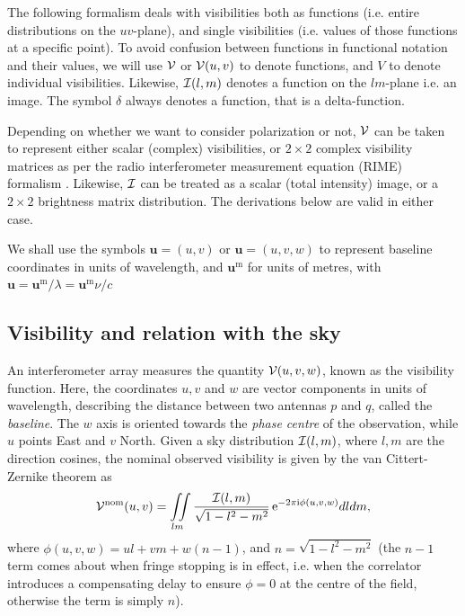 \documentclass[useAMS,usenatbib]{mn2e}
\newcommand{\ee}{\mathrm{e}}
\newcommand{\ii}{\mathrm{i}}
\begin{document}
The following formalism deals with visibilities both as functions (i.e. entire distributions on the $uv$-plane), 
and single visibilities (i.e. values of those functions at a specific point). To avoid confusion between functions in
functional notation and their values, we will use $\mathcal{V}$ or 
$\mathcal{V}(u,v)$ to denote functions, and $V$ to denote individual visibilities. Likewise, $\mathcal{I}(l,m)$ denotes a function 
on the $lm$-plane i.e. an image. The symbol $\delta$ always denotes a function, that is a delta-function.

Depending on whether we want to consider polarization or not, $\mathcal{V}$ can be taken to represent either 
scalar (complex) visibilities, or $2\times2$ complex visibility matrices  as per the radio interferometer 
measurement equation (RIME) formalism \citep{smirnov2011revisiting}. Likewise, $\mathcal{I}$ can be treated as a scalar 
(total intensity) image, or a $2\times2$ brightness matrix distribution. The derivations below 
are valid in either case.

We shall use the symbols $\mathbf{u}=(u,v)$ or $\mathbf{u}=(u,v,w)$ to represent baseline coordinates in units of wavelength, and 
$\mathbf{u}^\mathrm{m}$ for units of metres, with $\mathbf{u} = \mathbf{u}^\mathrm{m}/\lambda = \mathbf{u}^\mathrm{m}\nu/c$

\subsection{Visibility and relation with the sky}
\label{sec:visSky}
An interferometer array measures the quantity $\mathcal{V}(u,v,w)$, known as the visibility function.
Here, the coordinates $u,v$ and $w$ are vector components in units of wavelength, describing the distance between 
two antennas $p$ and $q$, called the \emph{baseline}. The $w$ axis is oriented towards the \emph{phase centre} of the observation,
while $u$ points East and $v$ North. Given a sky distribution $\mathcal{I}(l,m)$, where $l,m$ are the direction cosines,
the nominal observed visibility is given by the van 
Cittert-Zernike theorem \citep{thompson1999fundamentals} as
\begin{equation}
\VV^\mathrm{nom}(u,v) =\iint\limits_{lm} \frac{\II(l,m)}{\sqrt{1-l^2 - m^2}}\,\ee^{-2\pi\ii\phi (u,v,w)}dldm, \label{eq:visSky:nom}
\end{equation} 
where $\phi(u,v,w)=ul+vm+w(n-1)$, and $n=\sqrt{1-l^2 - m^2}$ (the $n-1$ term comes about when fringe 
stopping is in effect, i.e. when 
the correlator introduces a compensating delay to ensure $\phi=0$ at the centre of the field, otherwise the term is simply $n$). 
\end{document}

